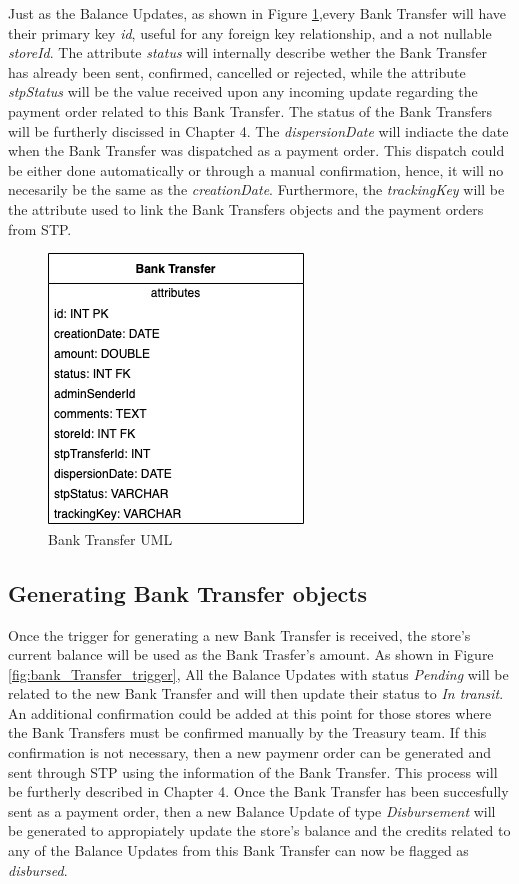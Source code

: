 Just as the Balance Updates, as shown in Figure \ref{fig:uml_bank_transfers},every Bank Transfer will have their primary key \textit{id}, useful for any foreign key relationship, and a not nullable \textit{storeId}. The attribute \textit{status} will internally describe wether the Bank Transfer has already been sent, confirmed, cancelled or rejected, while the attribute \textit{stpStatus} will be the value received upon any incoming update regarding the payment order related to this Bank Transfer. The status of the Bank Transfers will be furtherly discissed in Chapter 4. The \textit{dispersionDate} will indiacte the date when the Bank Transfer was dispatched as a payment order. This dispatch could be either done automatically or through a manual confirmation, hence, it will no necesarily be the same as the \textit{creationDate}. Furthermore, the \textit{trackingKey} will be the attribute used to link the Bank Transfers objects and the payment orders from STP.

\begin{figure} [H]
    \centering
    \includegraphics[scale = 0.7]{assets/uml/BankTransfers.png}
    \caption{Bank Transfer UML}\label{fig:uml_bank_transfers}
\end{figure}

\subsection{Generating Bank Transfer objects}

Once the trigger for generating a new Bank Transfer is received, the store's current balance will be used as the Bank Trasfer's amount. As shown in Figure \ref{fig:bank_Transfer_trigger}, All the Balance Updates with status \textit{Pending} will be related to the new Bank Transfer and will then update their status to \textit{In transit}. An additional confirmation could be added at this point for those stores where the Bank Transfers must be confirmed manually by the Treasury team. If this confirmation is not necessary, then a new paymenr order can be generated and sent through STP using the information of the Bank Transfer. This process will be furtherly described in Chapter 4. Once the Bank Transfer has been succesfully sent as a payment order, then a new Balance Update of type \textit{Disbursement} will be generated to appropiately update the store's balance and the credits related to any of the Balance Updates from this Bank Transfer can now be flagged as \textit{disbursed}.\\

